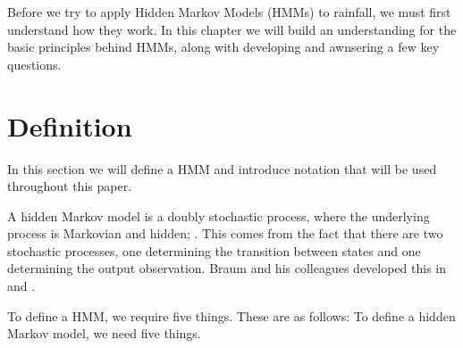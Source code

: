 
Before we try to apply Hidden Markov Models (HMMs) to rainfall, we must first understand how they work. In this chapter we will build an understanding for the basic principles behind HMMs, along with developing and awnsering a few key questions.

\section{Definition}
\label{Hidden_Markov:Definition}

In this section we will define a HMM and introduce notation that will be used throughout this paper. 

A hidden Markov model is a doubly stochastic process, where the underlying process is Markovian and hidden; \cite{Rabiner1986}. This comes from the fact that there are two stochastic processes, one determining the transition between states and one determining the output observation. Braum and his colleagues developed this in \cite{Baum1967} and \cite{Baum1966}. 

To define a HMM, we require five things. These are as follows:
To define a hidden Markov model, we need five things.

